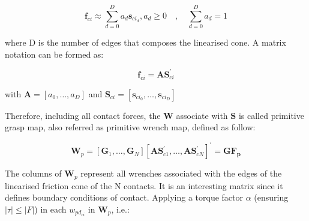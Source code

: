 \begin{figure}[h!]
\end{figure}


\begin{equation}
	\mathbf{f}_{ci} \approx \sum_{d=0}^{D} a_{d} \mathbf{s}_{ci_d}, a_{d} \geq 0 \quad, \quad \sum_{d=0}^{D} a_{d}=1
\end{equation}

where D is the number of edges that composes the linearised cone. A matrix notation can be formed as:

\begin{equation}
	\mathbf{f}_{ci}=\mathbf{A} \mathbf{S}_{ci}^{\prime}
\end{equation}

with $\mathbf{A}=\left[a_{0}, \ldots, a_{D}\right]$ and $\mathbf{S}_{ci}=\left[\mathbf{s}_{ci_0}, \ldots, \mathbf{s}_{ci_D}\right]$

Therefore, including all contact forces, the $\mathbf{W}$ associate with $\mathbf{S}$ is called primitive grasp map, also referred as primitive wrench map, defined as follow:

\begin{equation}
	\mathbf{W}_{p}=\left[\mathbf{G}_{1}, \ldots, \mathbf{G}_{N}\right]\left[\mathbf{A} \mathbf{S}_{c 1}^{\prime}, \ldots, \mathbf{A} \mathbf{S}_{c N}^{\prime}\right]^{\prime}=\mathbf{G} \mathbf{F}_{\mathbf{p}}
\end{equation}

The columns of $\mathbf{W}_{p}$ represent all wrenches associated with the edges of the linearised friction cone of the N contacts. It is an interesting matrix since it defines boundary conditions of contact. Applying a torque factor $\alpha$ (ensuring $|\tau| \leq|F|$) in each $w_{pd_{ci}}$ in $\mathbf{W}_{p}$, i.e.:

